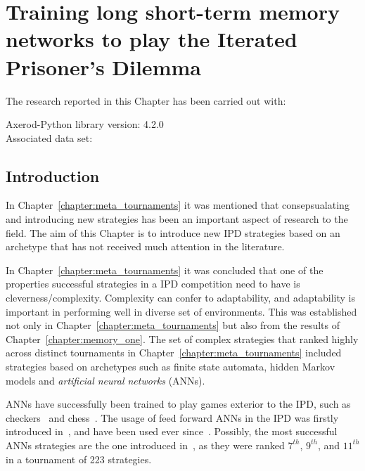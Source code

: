 \chapter{Training long short-term memory networks to play the Iterated Prisoner's Dilemma}\label{chapter:lstm}

\begin{center}
    The research reported in this Chapter has been carried out with:

    Axerod-Python library version: 4.2.0 \\
    Associated data set: \\ \vspace{.5cm} %
\end{center}

\hrulefill

\section{Introduction}

In Chapter~\ref{chapter:meta_tournaments} it was mentioned that consepsualating
and introducing new strategies has been an important aspect of research to the
field. The aim of this Chapter is to introduce new IPD strategies based on an
archetype that has not received much attention in the literature.

In Chapter~\ref{chapter:meta_tournaments} it was concluded that one of the
properties successful strategies in a IPD competition need to have is
cleverness/complexity. Complexity can confer to adaptability, and adaptability
is important in performing well in diverse set of environments. This was
established not only in Chapter~\ref{chapter:meta_tournaments} but also from the
results of Chapter~\ref{chapter:memory_one}. The set of complex strategies that
ranked highly across distinct tournaments in
Chapter~\ref{chapter:meta_tournaments} included strategies based on archetypes
such as finite state automata, hidden Markov models and \textit{artificial
neural networks} (ANNs).

ANNs have successfully been trained to play games exterior to the IPD, such as
checkers~\cite{Chellapilla1999} and chess~\cite{Fogel2004}. The usage of feed
forward ANNs in the IPD was firstly introduced in~\cite{Harrald1996}, and have
been used ever since~\cite{Ashlock2008, Ashlock2006a, Darwen2001, Franken2005}.
Possibly, the most successful ANNs strategies are the one introduced
in~\cite{Harper2017}, as they were ranked \(7^{th}\), \(9^{th}\), and
\(11^{th}\) in a tournament of 223 strategies.


